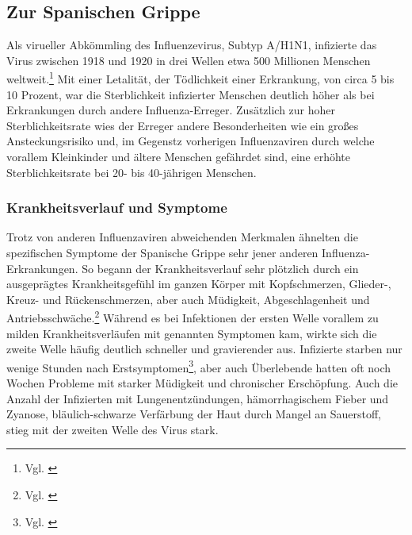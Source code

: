 \documentclass[12pt]{article}
\begin{document}
\subsection{Zur Spanischen Grippe}
Als virueller Abkömmling des Influenzevirus, Subtyp A/H1N1, infizierte das Virus zwischen 1918 und 1920 in drei Wellen etwa 500 Millionen Menschen weltweit.\footnote{Vgl. \cite{Span}} Mit einer Letalität, der Tödlichkeit einer Erkrankung, von circa 5 bis 10 Prozent, war die Sterblichkeit infizierter Menschen deutlich höher als bei Erkrankungen durch andere Influenza-Erreger. Zusätzlich zur hoher Sterblichkeitsrate wies der Erreger andere Besonderheiten wie ein großes Ansteckungsrisiko und, im Gegenstz vorherigen Influenzaviren durch welche vorallem Kleinkinder und ältere Menschen gefährdet sind, eine erhöhte Sterblichkeitsrate bei 20- bis 40-jährigen Menschen. 

\subsubsection{Krankheitsverlauf und Symptome}
Trotz von anderen Influenzaviren abweichenden Merkmalen ähnelten die spezifischen Symptome der Spanische Grippe sehr jener anderen Influenza-Erkrankungen. So begann der Krankheitsverlauf sehr plötzlich durch ein ausgeprägtes Krankheitsgefühl im ganzen Körper mit Kopfschmerzen, Glieder-, Kreuz- und Rückenschmerzen, aber auch Müdigkeit, Abgeschlagenheit und Antriebsschwäche.\footnote{Vgl. \cite{Span}} Während es bei Infektionen der ersten Welle vorallem zu milden Krankheitsverläufen mit genannten Symptomen kam, wirkte sich die zweite Welle häufig deutlich schneller und gravierender aus. Infizierte starben nur wenige Stunden nach Erstsymptomen\footnote{Vgl. \cite{Hanan2021}}, aber auch Überlebende hatten oft noch Wochen Probleme mit starker Müdigkeit und chronischer Erschöpfung. Auch die Anzahl der Infizierten mit Lungenentzündungen, hämorrhagischem Fieber und Zyanose, bläulich-schwarze Verfärbung der Haut durch Mangel an Sauerstoff, stieg mit der zweiten Welle des Virus stark. 
\end{document}
